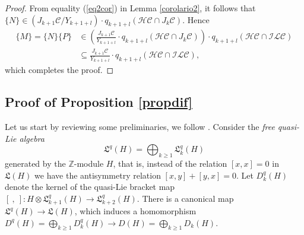 \documentclass[10pt]{amsart}
\numberwithin{equation}{section}
\numberwithin{equation}{section}
\theoremstyle{definition}
\begin{document}
\begin{proof}
\noindent From equality (\ref{eq2cor}) in Lemma \ref{corolario2}, it follows  that $\{N\}\in \left(J_{k+1}\mathcal{C}/Y_{k+1+l}\right)\cdot q_{k+1+l}\left(\mathcal{HC}\cap J_k\mathcal{C}\right)$. Hence
\begin{align*}
\{M\}=\{N\}\{P\}&\in \left(\frac{J_{k+1}\mathcal{C}}{Y_{k+1+l}}\cdot q_{k+1+l}\left(\mathcal{HC}\cap J_k\mathcal{C}\right)\right)\cdot q_{k+1+l}\left(\mathcal{HC\cap\mathcal{ILC}}\right)\\
								 &\subseteq \frac{J_{k+1}\mathcal{C}}{Y_{k+1+l}}\cdot q_{k+1+l}\left(\mathcal{HC}\cap \mathcal{ILC}\right),
\end{align*}
which completes the proof.
\end{proof}

\subsection{Proof of Proposition \ref{propdif}}\label{section4.4}
Let us start by reviewing some preliminaries, we follow  \cite{MR2240921}. Consider the \emph{free quasi-Lie algebra} 
$$\mathfrak{L}^q(H)=\bigoplus_{k\geq 1}\mathfrak{L}^q_{k}(H)$$
generated by the $\mathbb{Z}$-module $H$, that is, instead of the relation $[x,x]=0$ in $\mathfrak{L}(H)$ we have the antisymmetry relation $[x,y]+[y,x]=0$.
Let $D^q_k(H)$ denote the kernel of the quasi-Lie bracket map $\left[\ ,\ \right]: H\otimes\mathfrak{L}^q_{k+1}(H)\rightarrow\mathfrak{L}^q_{k+2}(H)$. There is a canonical map  $\mathfrak{L}^q(H)\rightarrow\mathfrak{L}(H)$, which induces a homomorphism $D^q(H)=\bigoplus_{k\geq1} D^q_k(H)\rightarrow D(H)=\bigoplus_{k\geq1}D_k(H)$.
\end{document}
